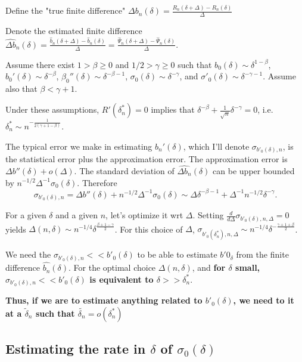 \documentclass[a4paper]{article}
\begin{document}
Define the "true finite difference" $\Delta b_n(\delta) = \frac{R_n(\delta + \Delta) - R_n(\delta)}{\Delta}$

Denote the estimated finite difference $\widehat{\Delta b}_n(\delta) = \frac{\hat{b}_n(\delta + \Delta) - \hat{b}_n(\delta)}{\Delta} = \frac{\hat{\Psi}_n(\delta + \Delta) - \hat{\Psi}_n(\delta)}{\Delta}$.

\medskip

Assume there exist $1 > \beta \geq 0$ and $1/2 > \gamma \geq 0$ such that $b_0(\delta) \sim \delta^{1 - \beta}$, $b_0'(\delta) \sim \delta^{-\beta}$, $\beta_0''(\delta) \sim \delta^{-\beta - 1}$, $\sigma_0(\delta) \sim \delta^{-\gamma}$, and $\sigma'_0(\delta) \sim \delta^{-\gamma - 1}$. Assume also that $\beta < \gamma + 1$.

Under these assumptions, $R'(\delta_n^*) = 0$ implies that $\delta^{-\beta}  + \frac{1}{\sqrt{n}} \delta^{-\gamma} = 0$, i.e. $\delta_n^* \sim n^{-\frac{1}{2(\gamma + 1 - \beta)}}$.

\smallskip

The typical error we make in estimating $b_n'(\delta)$, which I'll denote $\sigma_{b'_0(\delta), n}$, is the statistical error plus the approximation error. The approximation error is $\Delta b''(\delta) + o(\Delta)$. The standard deviation of $\widehat{\Delta b_n}(\delta)$ can be upper bounded by $n^{-1/2} \Delta^{-1} \sigma_0(\delta)$. Therefore
$$\sigma_{b'_0(\delta), n} = \Delta b''(\delta) + n^{-1/2} \Delta^{-1} \sigma_0(\delta) \sim \Delta \delta^{-\beta - 1} + \Delta^{-1} n^{-1/2} \delta^{-\gamma}.$$


For a given $\delta$ and a given $n$, let's optimize it wrt $\Delta$. Setting $ \frac{d}{d \Delta} \sigma_{b'_0(\delta), n, \Delta} = 0$ yields $\Delta(n, \delta) \sim n^{-1/4} \delta^\frac{\beta + 1 - \gamma}{2}$. For this choice of $\Delta$, $\sigma_{b'_0   (\delta^*_n), n, \Delta} \sim n^{-1/4} \delta^{-\frac{\gamma + 1 + \beta}{2}}$.


We need the $\sigma_{b'_0(\delta), n} << b'_0(\delta)$ to be able to estimate $b'0_{\delta}$ from the finite difference $\widehat{b_n}(\delta)$. For the optimal choice $\Delta(n, \delta)$, and \textbf{for $\delta$ small, $\sigma_{b'_0(\delta), n} << b'_0(\delta)$ is equivalent to $\delta >> \delta_n^*$}.

\textbf{Thus, if we are to estimate anything related to $b'_0(\delta)$, we need to it at a $\tilde{\delta}_n$ such that $\tilde{{\delta}_n} = o(\delta_n^*)$}

\subsection{Estimating the rate in $\delta$ of $\sigma_0(\delta)$}
\end{document}
